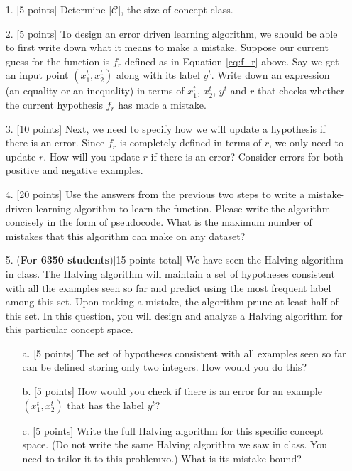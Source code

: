\begin{enumerate}


\item[1.] [5 points] Determine $|\mathcal{C}|$, the size of concept
  class.
  
\item[2.] [5 points] To design an error driven learning algorithm, we
  should be able to first write down what it means to make a mistake.
  Suppose our current guess for the function is $f_r$ defined as in
  Equation \ref{eq:f_r} above. Say we get an input point $(x_1^t,
  x_2^t)$ along with its label $y^t$. Write down an expression (an
  equality or an inequality) in terms of $x_1^t$, $x_2^t$, $y^t$ and
  $r$ that checks whether the current hypothesis $f_r$ has made a
  mistake.

\item[3.] [10 points] Next, we need to specify how we will update a
  hypothesis if there is an error. Since $f_r$ is completely defined
  in terms of $r$, we only need to update $r$. How will you update $r$
  if there is an error? Consider errors for both positive and negative
  examples.

\item[4.] [20 points] Use the answers from the previous two steps to
  write a mistake-driven learning algorithm to learn the function.
  Please write the algorithm concisely in the form of pseudocode. What
  is the maximum number of mistakes that this algorithm can make on
  any dataset?

\item[5.] ({\bf For 6350 students})[15 points total] We have seen the
  Halving algorithm in class. The Halving algorithm will maintain a
  set of hypotheses consistent with all the examples seen so far and
  predict using the most frequent label among this set. Upon making a
  mistake, the algorithm prune at least half of this set. In this
  question, you will design and analyze a Halving algorithm for this
  particular concept space.

  \begin{enumerate}
  \item[a.] [5 points] The set of hypotheses consistent with all examples
    seen so far can be defined storing only two integers. How would
    you do this?
  \item[b.] [5 points] How would you check if there is an error for an
    example $(x_1^t, x_2^t)$ that has the label $y^t$?
  \item[c.] [5 points] Write the full Halving algorithm for this
    specific concept space. (Do not write the same Halving algorithm
    we saw in class. You need to tailor it to this problemxo.) What is
    its mistake bound?
  \end{enumerate}

\end{enumerate}

